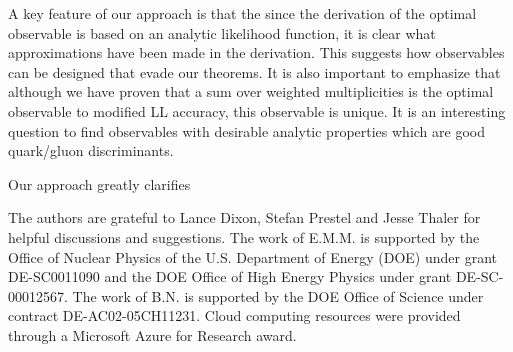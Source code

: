 \documentclass[letterpaper,11pt]{article}
\begin{document}
A key feature of our approach is that the since the derivation of the optimal observable is based on an analytic likelihood function, it is clear what approximations have been made in the derivation. This suggests how observables can be designed that evade our theorems. It is also important to emphasize that although we have proven that a sum over weighted multiplicities is the optimal observable to modified LL accuracy, this observable is unique. It is an interesting question to find observables with desirable analytic properties which are good quark/gluon discriminants.


Our approach greatly clarifies 


\acknowledgments

The authors are grateful to Lance Dixon, Stefan Prestel and Jesse Thaler for helpful discussions and suggestions.
%
The work of E.M.M. is supported by the Office of Nuclear Physics of the U.S. Department of Energy (DOE) under grant DE-SC0011090 and the DOE Office of High Energy Physics under grant DE-SC-00012567.
%
The work of B.N. is supported by the DOE Office of Science under contract DE-AC02-05CH11231.
%
Cloud computing resources were provided through a Microsoft Azure for Research award.



\end{document}
